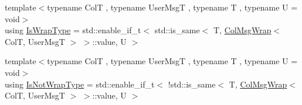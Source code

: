 \begin{DoxyCompactItemize}
\item 
{\footnotesize template$<$typename ColT , typename User\+MsgT , typename T , typename U  = void$>$ }\\using \hyperlink{structvt_1_1vrt_1_1collection_1_1_collection_manager_a1f91c97ed52237c3a3576dfbbe87c8f8}{Is\+Wrap\+Type} = std\+::enable\+\_\+if\+\_\+t$<$ std\+::is\+\_\+same$<$ T, \hyperlink{structvt_1_1vrt_1_1collection_1_1_col_msg_wrap}{Col\+Msg\+Wrap}$<$ ColT, User\+MsgT $>$ $>$\+::value, U $>$
\item 
{\footnotesize template$<$typename ColT , typename User\+MsgT , typename T , typename U  = void$>$ }\\using \hyperlink{structvt_1_1vrt_1_1collection_1_1_collection_manager_a18e3a17d9eb086c6c2f499242b7faa1e}{Is\+Not\+Wrap\+Type} = std\+::enable\+\_\+if\+\_\+t$<$ !std\+::is\+\_\+same$<$ T, \hyperlink{structvt_1_1vrt_1_1collection_1_1_col_msg_wrap}{Col\+Msg\+Wrap}$<$ ColT, User\+MsgT $>$ $>$\+::value, U $>$
\end{DoxyCompactItemize}
